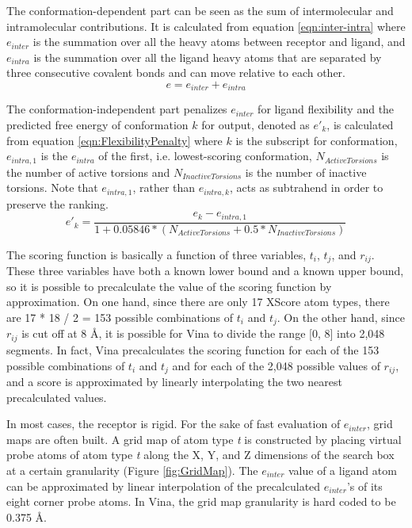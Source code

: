 The conformation-dependent part can be seen as the sum of intermolecular and intramolecular contributions. It is calculated from equation \eqref{eqn:inter-intra} where $e_{inter}$ is the summation over all the heavy atoms between receptor and ligand, and $e_{intra}$ is the summation over all the ligand heavy atoms that are separated by three consecutive covalent bonds and can move relative to each other.
\begin{equation}
\label{eqn:inter-intra}
e = e_{inter} + e_{intra}
\end{equation}

The conformation-independent part penalizes $e_{inter}$ for ligand flexibility and the predicted free energy of conformation $k$ for output, denoted as $e'_k$, is calculated from equation \eqref{eqn:FlexibilityPenalty} where $k$ is the subscript for conformation, $e_{intra,1}$ is the $e_{intra}$ of the first, i.e. lowest-scoring conformation, $N_{Active Torsions}$ is the number of active torsions and $N_{InactiveTorsions}$ is the number of inactive torsions. Note that $e_{intra,1}$, rather than $e_{intra,k}$, acts as subtrahend in order to preserve the ranking.
\begin{equation}
\label{eqn:FlexibilityPenalty}
e'_k = \frac{e_k - e_{intra,1}}{1 + 0.05846 * (N_{ActiveTorsions} + 0.5 * N_{InactiveTorsions})}
\end{equation}

The scoring function is basically a function of three variables, $t_i$, $t_j$, and $r_{ij}$. These three variables have both a known lower bound and a known upper bound, so it is possible to precalculate the value of the scoring function by approximation. On one hand, since there are only 17 XScore atom types, there are 17 * 18 / 2 = 153 possible combinations of $t_i$ and $t_j$. On the other hand, since $r_{ij}$ is cut off at 8 \AA, it is possible for Vina to divide the range [0, 8] into 2,048 segments. In fact, Vina precalculates the scoring function for each of the 153 possible combinations of $t_i$ and $t_j$ and for each of the 2,048 possible values of $r_{ij}$, and a score is approximated by linearly interpolating the two nearest precalculated values.

In most cases, the receptor is rigid. For the sake of fast evaluation of $e_{inter}$, grid maps are often built. A grid map of atom type \textit{t} is constructed by placing virtual probe atoms of atom type \textit{t} along the X, Y, and Z dimensions of the search box at a certain granularity (Figure \ref{fig:GridMap}). The $e_{inter}$ value of a ligand atom can be approximated by linear interpolation of the precalculated $e_{inter}$'s of its eight corner probe atoms. In Vina, the grid map granularity is hard coded to be 0.375 \AA.


